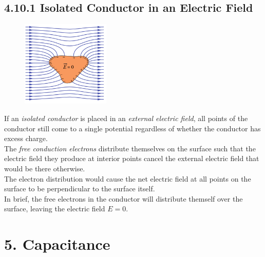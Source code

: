 \documentclass[12pt, a4paper]{article}
\begin{document}
		\subsection*{4.10.1 Isolated Conductor in an Electric Field}

		\begin{figure}
			\centering
			\includegraphics[width=4.2cm]{Physics2_PNGs/isolated-conduct-elec-field.png}
			\caption*{}
			\label{fig:isolated-conduct-elec-field.png}
		\end{figure}
		If an \textit{isolated conductor} is placed in an \textit{external electric field}, all points of the conductor still come to a single potential regardless of whether the conductor has excess charge. \\
		The \textit{free conduction electrons} distribute themselves on the surface such that the electric field they produce at interior points cancel the external electric field that would be there otherwise.  \\
		The electron distribution would cause the net electric field at all points on the surface to be perpendicular to the surface itself. \\
		In brief, the free electrons in the conductor will distribute themself over the surface, leaving the electric field $E = 0$.
		
		
		
		
		\newpage
		
		\section*{5. Capacitance}
		
\end{document}
